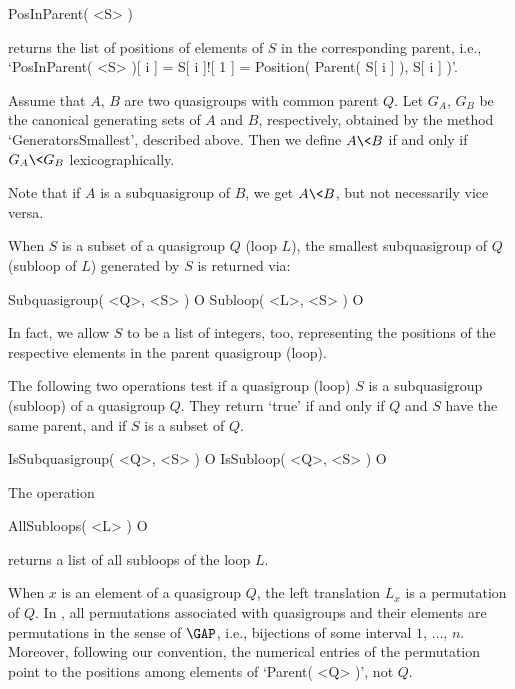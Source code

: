 \>PosInParent( <S> )

returns the list of positions of elements of $S$ in the corresponding parent,
i.e., `PosInParent( <S> )[ i ] = S[ i ]![ 1 ] = Position( Parent( S[ i ] ), S[
i ] )'.


\noindent Assume that $A$, $B$ are two quasigroups with common parent $Q$. Let
$G_A$, $G_B$ be the canonical generating sets of $A$ and $B$, respectively,
obtained by the method `GeneratorsSmallest', described above. Then we
define $A \< B$ if and only if $G_A \< G_B$ lexicographically.

Note that if $A$ is a subquasigroup of $B$, we get $A\<B$, but not necessarily
vice versa.



When $S$ is a subset of a quasigroup $Q$ (loop $L$), the smallest subquasigroup
of $Q$ (subloop of $L$) generated by $S$ is returned via:

\>Subquasigroup( <Q>, <S> ) O
\>Subloop( <L>, <S> ) O

In fact, we allow $S$ to be a list of integers, too, representing the positions
of the respective elements in the parent quasigroup (loop).

The following two operations test if a quasigroup (loop) $S$ is a subquasigroup
(subloop) of a quasigroup $Q$. They return `true' if and only if $Q$ and $S$
have the same parent, and if $S$ is a subset of $Q$.

\>IsSubquasigroup( <Q>, <S> ) O
\>IsSubloop( <Q>, <S> ) O

The operation

\>AllSubloops( <L> ) O

returns a list of all subloops of the loop $L$.


When $x$ is an element of a quasigroup $Q$, the left translation $L_x$ is a
permutation of $Q$. In {\LOOPS}, all permutations associated with quasigroups
and their elements are permutations in the sense of ${\GAP}$, i.e., bijections
of some interval $1$, $\dots$, $n$. Moreover, following our convention, the
numerical entries of the permutation point to the positions among elements of
`Parent( <Q> )', not $Q$.

